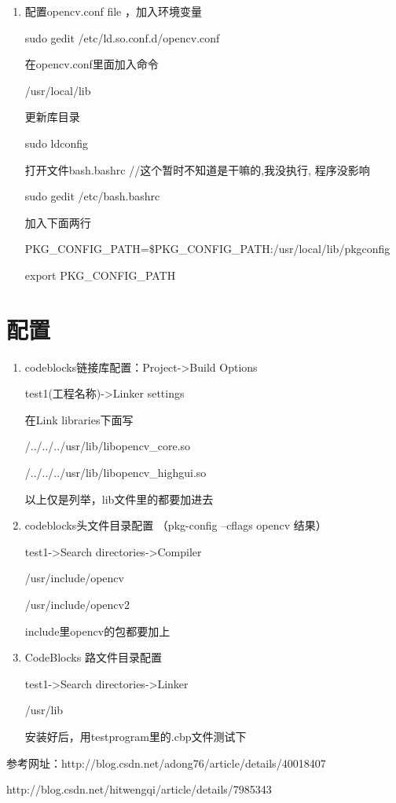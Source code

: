 \documentclass[a4paper,12pt]{article}
\begin{document}
\begin{enumerate}
\begin{enumerate}
\end{enumerate}

\item 配置opencv.conf file ，加入环境变量  

sudo gedit /etc/ld.so.conf.d/opencv.conf

在opencv.conf里面加入命令

/usr/local/lib

更新库目录

sudo ldconfig

打开文件bash.bashrc  //这个暂时不知道是干嘛的,我没执行, 程序没影响

sudo gedit /etc/bash.bashrc

加入下面两行

PKG\_CONFIG\_PATH=\$PKG\_CONFIG\_PATH:/usr/local/lib/pkgconfig

export PKG\_CONFIG\_PATH

\end{enumerate}

\section{配置}

\begin{enumerate}
\item codeblocks链接库配置：Project->Build Options

test1(工程名称)->Linker settings

在Link libraries下面写

/../../../usr/lib/libopencv\_core.so

/../../../usr/lib/libopencv\_highgui.so

以上仅是列举，lib文件里的都要加进去

\item codeblocks头文件目录配置 （pkg-config --cflags opencv 结果）

test1->Search directories->Compiler

/usr/include/opencv

/usr/include/opencv2

include里opencv的包都要加上

\item CodeBlocks 路文件目录配置

test1->Search directories->Linker

/usr/lib

安装好后，用testprogram里的.cbp文件测试下

\end{enumerate}

参考网址：http://blog.csdn.net/adong76/article/details/40018407
          
         http://blog.csdn.net/hitwengqi/article/details/7985343
\end{document}

